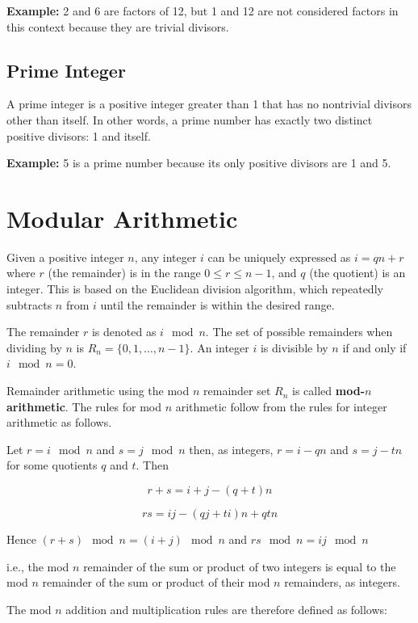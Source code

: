 \documentclass[11pt, letterpaper]{article}
\begin{document}
\textbf{Example:} 2 and 6 are factors of 12, but 1 and 12 are not considered factors in this context because they are trivial divisors.

\subsection{Prime Integer}
A prime integer is a positive integer greater than 1 that has no nontrivial divisors other than itself. In other words, a prime number has exactly two distinct positive divisors: 1 and itself.

\textbf{Example:} 5 is a prime number because its only positive divisors are 1 and 5.

\section{Modular Arithmetic}

Given a positive integer \( n \), any integer \( i \) can be uniquely expressed as \( i = qn + r \) where \( r \) (the remainder) is in the range \( 0 \leq r \leq n - 1 \), and \( q \) (the quotient) is an integer. This is based on the Euclidean division algorithm, which repeatedly subtracts \( n \) from \( i \) until the remainder is within the desired range.

The remainder \( r \) is denoted as \( i \mod n \). The set of possible remainders when dividing by \( n \) is \( R_n = \{0, 1, \ldots, n - 1\} \). An integer \( i \) is divisible by \( n \) if and only if \( i \mod n = 0 \).

Remainder arithmetic using the mod \( n \) remainder set \( R_n \) is called \textbf{mod-\( n \) arithmetic}. The rules for mod \( n \) arithmetic follow from the rules for integer arithmetic as follows.

Let \( r = i \mod n \) and \( s = j \mod n \) then, as integers, \( r = i - qn \) and \( s = j - tn \) for some quotients \( q \) and \( t \). Then

\[
r + s = i + j - (q + t)n
\]

\[
rs = ij - (qj + ti)n + qtn
\]

Hence \( (r + s) \mod n = (i + j) \mod n \) and \( rs \mod n = ij \mod n \)

i.e., the mod \( n \) remainder of the sum or product of two integers is equal to the mod \( n \) remainder of the sum or product of their mod \( n \) remainders, as integers.

The mod \( n \) addition and multiplication rules are therefore defined as follows:
\end{document}
